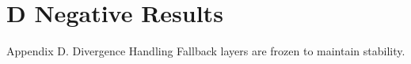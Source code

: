 \section{D Negative Results}

 Appendix D. Divergence Handling
Fallback layers are frozen to maintain stability.

